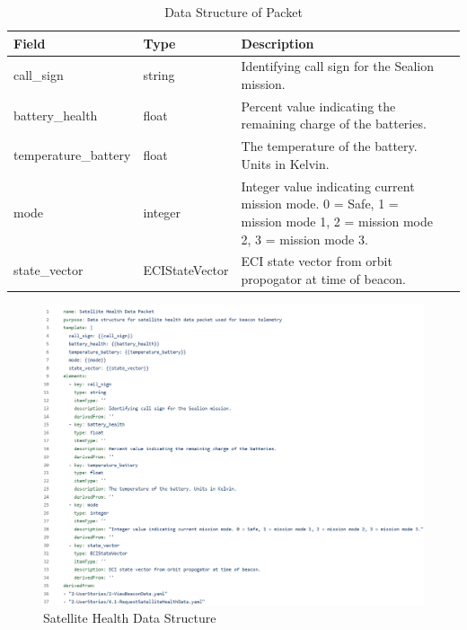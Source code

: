 \documentclass[journal,article,submit,pdftex,moreauthors]{Definitions/mdpi}
\begin{document}
\begin{table}[H] 
	\caption{Data Structure of Packet}
	\label{tab:datastructure}
	\begin{tabularx}{\textwidth}{CCCC}
	\toprule
	\textbf{Field}  & \textbf{Type}  & \textbf{Description}\\
	\midrule
	call\_sign           & string         & Identifying call sign for the Sealion mission.                                                                         \\ \hline
	battery\_health      & float          & Percent value indicating the remaining charge of the batteries.                                                        \\ \hline
	temperature\_battery & float          & The temperature of the battery. Units in Kelvin.                                                                       \\ \hline
	mode                 & integer        & Integer value indicating current mission mode. 0 = Safe, 1 = mission mode 1, 2 =   mission mode 2, 3 = mission mode 3. \\ \hline
	state\_vector        & ECIStateVector & ECI state vector from orbit propogator at time of beacon. \\    
	\bottomrule
	\end{tabularx}
\end{table}

\begin{figure}[H]
    \includegraphics[width=13.75 cm]{assets/datastructure.png}
    \caption{Satellite Health Data Structure}
	\label{fig:datastructure}
    \end{figure}   
\unskip
\end{document}
